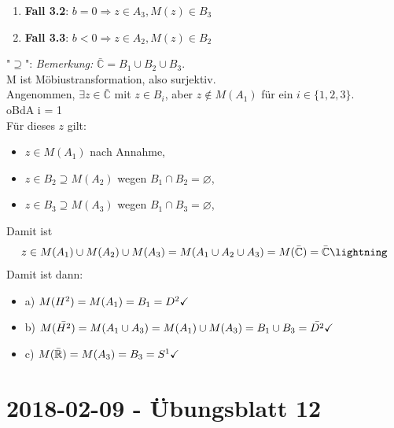 \begin{problem*}[4]
\begin{enumerate}
  \item \textbf{Fall 3.2}: $b = 0 \Rightarrow z \in A_3, M(z) \in B_3$
  \item \textbf{Fall 3.3}: $b < 0 \Rightarrow z \in A_2, M(z) \in B_2$
\end{enumerate}
"$\supseteq$": \emph{Bemerkung:} $\bar{\mathbb{C}} = B_1 \cup B_2 \cup B_3$. \\
M ist Möbiustransformation, also surjektiv. \\
Angenommen, $\exists z \in \bar{\mathbb{C}}$ mit $z \in B_i$, aber $z \notin M(A_1)$ für ein $i \in \{ 1, 2, 3 \}$.\\
oBdA i = 1\\
Für dieses $ z $ gilt:
\begin{itemize}
  \item $z \in M(A_1)$ nach Annahme,
  \item $z \in B_2 \supseteq M(A_2)$ wegen $B_1 \cap B_2 = \varnothing$,
  \item $z \in B_3 \supseteq M(A_3)$ wegen $B_1 \cap B_3 = \varnothing$,
\end{itemize}
Damit ist
\begin{equation*}
z \in M(A_1) \cup M(A_2) \cup M(A_3) = M(A_1 \cup A_2 \cup A_3) = M(\bar{\mathbb{C}}) = \bar{\mathbb{C}} \hfill \lightning
\end{equation*}
Damit ist dann:
\begin{itemize}
  \item a) $M(H^2) = M(A_1) = B_1 = D^2 \hfill \checkmark $ 
  \item b) $M(\bar{H^2}) = M(A_1 \cup A_3) = M(A_1) \cup M(A_3) = B_1 \cup B_3 = \bar{D^2} \hfill \checkmark $
  \item c) $M(\bar{ \mathbb{R} }) = M(A_3) = B_3 = S^1 \hfill  \checkmark  $
\end{itemize}
\end{problem*}

\section{2018-02-09 - Übungsblatt 12 } %
\label{sec:übungsblatt_12}

